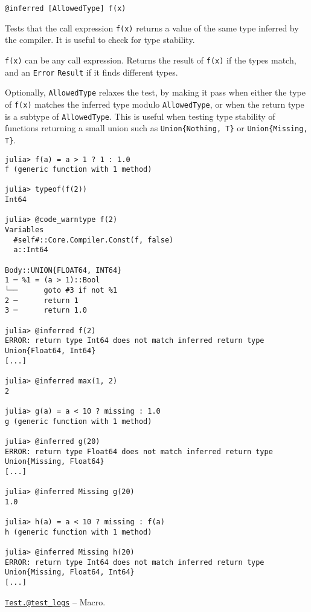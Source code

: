 \begin{adjustwidth}{2em}{0pt}


\begin{verbatim}
@inferred [AllowedType] f(x)
\end{verbatim}

Tests that the call expression \texttt{f(x)} returns a value of the same type inferred by the compiler. It is useful to check for type stability.

\texttt{f(x)} can be any call expression. Returns the result of \texttt{f(x)} if the types match, and an \texttt{Error} \texttt{Result} if it finds different types.

Optionally, \texttt{AllowedType} relaxes the test, by making it pass when either the type of \texttt{f(x)} matches the inferred type modulo \texttt{AllowedType}, or when the return type is a subtype of \texttt{AllowedType}. This is useful when testing type stability of functions returning a small union such as \texttt{Union\{Nothing, T\}} or \texttt{Union\{Missing, T\}}.


\begin{verbatim}
julia> f(a) = a > 1 ? 1 : 1.0
f (generic function with 1 method)

julia> typeof(f(2))
Int64

julia> @code_warntype f(2)
Variables
  #self#::Core.Compiler.Const(f, false)
  a::Int64

Body::UNION{FLOAT64, INT64}
1 ─ %1 = (a > 1)::Bool
└──      goto #3 if not %1
2 ─      return 1
3 ─      return 1.0

julia> @inferred f(2)
ERROR: return type Int64 does not match inferred return type Union{Float64, Int64}
[...]

julia> @inferred max(1, 2)
2

julia> g(a) = a < 10 ? missing : 1.0
g (generic function with 1 method)

julia> @inferred g(20)
ERROR: return type Float64 does not match inferred return type Union{Missing, Float64}
[...]

julia> @inferred Missing g(20)
1.0

julia> h(a) = a < 10 ? missing : f(a)
h (generic function with 1 method)

julia> @inferred Missing h(20)
ERROR: return type Int64 does not match inferred return type Union{Missing, Float64, Int64}
[...]
\end{verbatim}



\end{adjustwidth}
\hypertarget{1395021091279173086}{} 
\hyperlink{1395021091279173086}{\texttt{Test.@test\_logs}}  -- {Macro.}

